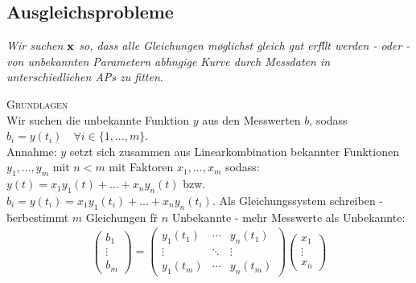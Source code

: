\subsection{Ausgleichsprobleme}
\emph{Wir suchen $\mbox{\bf x}$ so, dass alle Gleichungen m\o glichst gleich gut erf\u llt werden - oder - von unbekannten Parametern abh\a ngige Kurve durch Messdaten in unterschiedlichen APs zu \emph{fitten}}.

\textsc{Grundlagen}\\
Wir suchen die unbekannte Funktion $y$ aus den Messwerten $b$, sodass $b_i =y(t_i) \quad \forall i\in \{1,...,m\}$. \\ Annahme: $y$ setzt sich zusammen aus Linearkombination bekannter Funktionen $y_1, ..., y_m$ mit $n<m$ mit Faktoren $x_1, ...,x_m$ sodass: $y(t) = x_1y_1(t) + ... + x_ny_n(t)$ bzw. $b_i = y(t_i) = x_1y_1(t_i) + ... + x_ny_n(t_i)$. Als Gleichungssystem schreiben - \u berbestimmt $m$ Gleichungen f\u r $n$ Unbekannte - mehr Messwerte als Unbekannte:
\begin{align*}
\begin{pmatrix}
b_1 \\
\vdots\\
b_m
\end{pmatrix}
=
\begin{pmatrix}
y_1(t_1) & \cdots & y_n(t_1)\\
\vdots & \ddots & \vdots \\
y_1(t_m) & \cdots & y_n(t_m)
\end{pmatrix}
\begin{pmatrix}
x_1 \\
\vdots\\
x_n
\end{pmatrix}
\end{align*}

